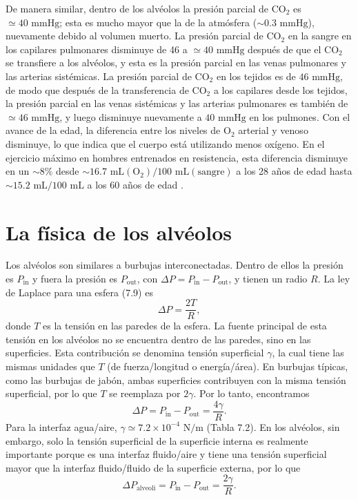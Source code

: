 \documentclass[12pt]{book}
\begin{document}
De manera similar, dentro de los alvéolos la presión parcial de $\text{CO}_2$ es $\simeq 40\text{ mmHg}$; esta es mucho mayor que la de la atmósfera ($\sim 0.3\text{ mmHg}$), nuevamente debido al volumen muerto. La presión parcial de $\text{CO}_2$ en la sangre en los capilares pulmonares disminuye de 46 a $\simeq 40\text{ mmHg}$ después de que el $\text{CO}_2$ se transfiere a los alvéolos, y esta es la presión parcial en las venas pulmonares y las arterias sistémicas. La presión parcial de $\text{CO}_2$ en los tejidos es de $46\text{ mmHg}$, de modo que después de la transferencia de $\text{CO}_2$ a los capilares desde los tejidos, la presión parcial en las venas sistémicas y las arterias pulmonares es también de $\simeq 46\text{ mmHg}$, y luego disminuye nuevamente a $40\text{ mmHg}$ en los pulmones. Con el avance de la edad, la diferencia entre los niveles de $\text{O}_2$ arterial y venoso disminuye, lo que indica que el cuerpo está utilizando menos oxígeno. En el ejercicio máximo en hombres entrenados en resistencia, esta diferencia disminuye en un $\sim 8\%$ desde $\sim 16.7\text{ mL}(\text{O}_2)/100\text{ mL}(\text{sangre})$ a los 28 años de edad hasta $\sim 15.2\text{ mL}/100\text{ mL}$ a los 60 años de edad \cite{36}.

\section{La física de los alvéolos}

Los alvéolos son similares a burbujas interconectadas. Dentro de ellos la presión es $P_{\text{in}}$ y fuera la presión es $P_{\text{out}}$, con $\Delta P = P_{\text{in}} - P_{\text{out}}$, y tienen un radio $R$. La ley de Laplace para una esfera (7.9) es
\begin{equation}
\Delta P = \frac{2T}{R},
\label{eq:9.1}
\end{equation}
donde $T$ es la tensión en las paredes de la esfera. La fuente principal de esta tensión en los alvéolos no se encuentra dentro de las paredes, sino en las superficies. Esta contribución se denomina tensión superficial $\gamma$, la cual tiene las mismas unidades que $T$ (de fuerza/longitud o energía/área). En burbujas típicas, como las burbujas de jabón, ambas superficies contribuyen con la misma tensión superficial, por lo que $T$ se reemplaza por $2\gamma$. Por lo tanto, encontramos
\begin{equation}
\Delta P = P_{\text{in}} - P_{\text{out}} = \frac{4\gamma}{R}.
\label{eq:9.2}
\end{equation}
Para la interfaz agua/aire, $\gamma \simeq 7.2 \times 10^{-4}\text{ N/m}$ (Tabla 7.2). En los alvéolos, sin embargo, solo la tensión superficial de la superficie interna es realmente importante porque es una interfaz fluido/aire y tiene una tensión superficial mayor que la interfaz fluido/fluido de la superficie externa, por lo que
\begin{equation}
\Delta P_{\text{alveoli}} = P_{\text{in}} - P_{\text{out}} = \frac{2\gamma}{R}.
\label{eq:9.3}
\end{equation}
\end{document}
